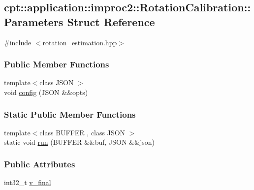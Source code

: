 \hypertarget{structcpt_1_1application_1_1improc2_1_1_rotation_calibration_1_1_parameters}{\subsection{cpt\-:\-:application\-:\-:improc2\-:\-:Rotation\-Calibration\-:\-:Parameters Struct Reference}
\label{structcpt_1_1application_1_1improc2_1_1_rotation_calibration_1_1_parameters}
}


{\ttfamily \#include $<$rotation\-\_\-estimation.\-hpp$>$}

\subsubsection*{Public Member Functions}
\begin{DoxyCompactItemize}
\item 
{\footnotesize template$<$class J\-S\-O\-N $>$ }\\void \hyperlink{structcpt_1_1application_1_1improc2_1_1_rotation_calibration_1_1_parameters_a8f72c35047765f37958f7588279f39a4}{config} (J\-S\-O\-N \&\&opts)
\end{DoxyCompactItemize}
\subsubsection*{Static Public Member Functions}
\begin{DoxyCompactItemize}
\item 
{\footnotesize template$<$class B\-U\-F\-F\-E\-R , class J\-S\-O\-N $>$ }\\static void \hyperlink{structcpt_1_1application_1_1improc2_1_1_rotation_calibration_1_1_parameters_a6491e482dba99999bf2a55d9bced3a62}{run} (B\-U\-F\-F\-E\-R \&\&buf, J\-S\-O\-N \&\&json)
\end{DoxyCompactItemize}
\subsubsection*{Public Attributes}
\begin{DoxyCompactItemize}
\item 
int32\-\_\-t \hyperlink{structcpt_1_1application_1_1improc2_1_1_rotation_calibration_1_1_parameters_aa25d24d4244c1dd2739a69f5e38f4ffd}{v\-\_\-final}
\end{DoxyCompactItemize}


